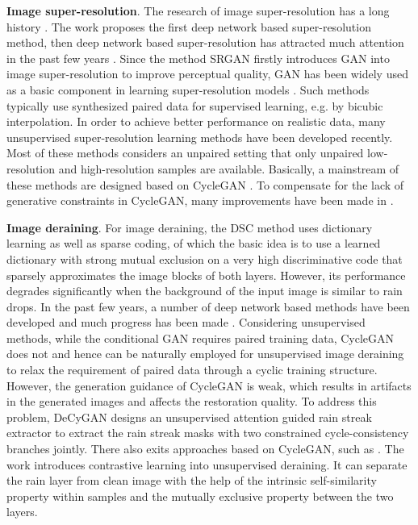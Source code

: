 \documentclass[10pt,journal,compsoc]{IEEEtran}
\begin{document}
\textbf{Image super-resolution}. 
The research of image super-resolution has a long history 
\cite{tsai1984multiframe,elad1997restoration, schultz1996extraction, glasner2009super}.
The work \cite{dong2015image} proposes the first deep network
based super-resolution method, then deep network based super-resolution 
has attracted much attention in the past few years \cite{kim2016accurate,ledig2017photo,wang2018esrgan,ranksrgan,rcan,rnan}.
Since the method SRGAN \cite{ledig2017photo} firstly 
introduces GAN \cite{gan} into image super-resolution to improve perceptual quality, 
GAN has been widely used as a basic component in learning super-resolution 
models \cite{wang2018esrgan,ranksrgan,rcan,rnan}.
Such methods typically use synthesized paired data 
for supervised learning, e.g. by bicubic interpolation.
In order to achieve better performance on realistic data,
many unsupervised super-resolution learning methods have been developed recently. 
Most of these methods considers an unpaired setting that only unpaired low-resolution 
and high-resolution samples are available.
Basically, a mainstream of these methods are designed based on CycleGAN \cite{cyclegan}. 
To compensate for the lack of generative constraints in CycleGAN,
many improvements have been made in
\cite{lugmayr2019unsupervised, yuan2018unsupervised, usis, 
bulat2018learn, zhao2018unsupervised, wang2021unsupervised, ahn2020simusr}.

\textbf{Image deraining}. 
For image deraining, the DSC method \cite{dsc} 
uses dictionary learning as well as sparse coding,
of which the basic idea is to use a learned dictionary with strong mutual exclusion 
on a very high discriminative code that 
sparsely approximates the image blocks of both layers. 
However, its performance degrades significantly when the background of 
the input image is similar to rain drops. In the past few years,
a number of deep network based methods have 
been developed and much progress has been made
\cite{rescan,multi,wei2019semi,fu2017clearing,li2019heavy}.
Considering unsupervised methods, 
while the conditional GAN \cite{cgan} requires paired training data, 
CycleGAN \cite{cyclegan} does not and hence can be naturally employed for unsupervised 
image deraining to relax the requirement of paired data through a cyclic training structure. 
However, the generation guidance of CycleGAN is weak, 
which results in artifacts in the generated images and affects the restoration quality. 
To address this problem, DeCyGAN \cite{deraincyclegan} designs an unsupervised attention 
guided rain streak extractor to extract the rain streak masks with two constrained 
cycle-consistency branches jointly. There also exits approaches based on CycleGAN, such as \cite{jin2019unsupervised, zhu2019singe}. The work \cite{ye2022unsupervised} introduces contrastive learning into unsupervised deraining. It can separate the rain layer from clean image with the help of the intrinsic self-similarity property within
samples and the mutually exclusive property between the two layers.
\end{document}
